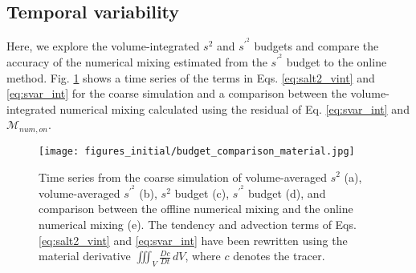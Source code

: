 \documentclass[draft]{agujournal2019}
\begin{document}
\subsection{Temporal variability}

Here, we explore the volume-integrated $s^2$ and $s^{\prime^2}$ budgets and compare the accuracy of the numerical mixing estimated from the $s^{\prime^2}$ budget to the online method. Fig. \ref{fig:budget_comparison} shows a time series of the terms in Eqs. \ref{eq:salt2_vint} and \ref{eq:svar_int} for the coarse simulation and a comparison between the volume-integrated numerical mixing calculated using the residual of Eq. \ref{eq:svar_int} and $\mathcal{M}_{num, on}$. 

\begin{figure}[ht!]
 \centerline{\texttt{[image: figures\_initial/budget\_comparison\_material.jpg]}}
  \caption{Time series from the coarse simulation of volume-averaged $s^2$ (a), volume-averaged $s^{\prime^2}$ (b), $s^2$ budget (c), $s^{\prime^2}$ budget (d), and comparison between the offline numerical mixing and the online numerical mixing (e). The tendency and advection terms of Eqs. \ref{eq:salt2_vint} and \ref{eq:svar_int} have been rewritten using the material derivative $\iiint_V \frac{Dc}{Dt} \, dV$, where $c$ denotes the tracer.}
  \label{fig:budget_comparison}
\end{figure}
\end{document}

